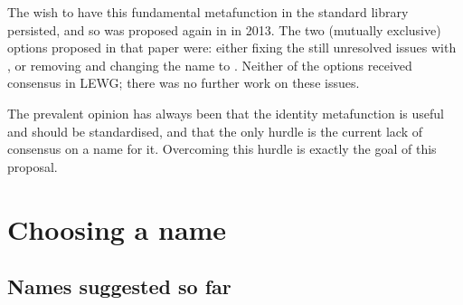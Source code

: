 The wish to have this fundamental metafunction in the standard library persisted, and so  was proposed again in \cite{N3766} in 2013. The two (mutually exclusive) options proposed in that paper were: either fixing the still unresolved issues with , or removing  and changing the name to . Neither of the options received consensus in LEWG; there was no further work on these issues.

The prevalent opinion has always been that the identity metafunction is useful and should be standardised, and that the only hurdle is the current lack of consensus on a name for it. Overcoming this hurdle is exactly the goal of this proposal.

\section{Choosing a name}

\subsection{Names suggested so far}

